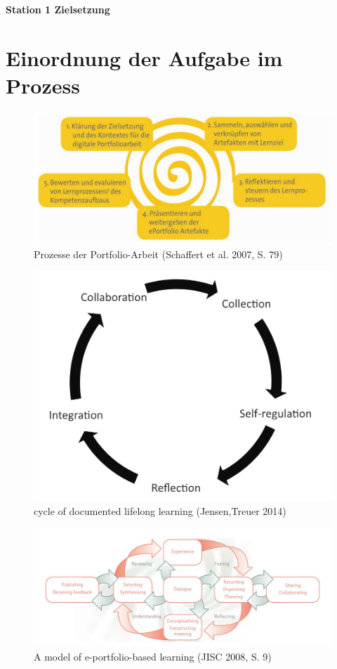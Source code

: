 \documentclass[a4paper,oneside]{scrarticle}
\begin{document}
	\pagestyle{fancy}
	\fancyhead{} %
	\fancyfoot{} %
	\begin{center}
		\begin{LARGE}
			\textbf{Station 1 Zielsetzung}
		\end{LARGE}
	\end{center}

	\section*{Einordnung der Aufgabe im Prozess}
	\begin{figure} [h]
		\centering
		\includegraphics[width=0.7\linewidth]{e-portfolio-prozesse-schaffert}
		\caption{Prozesse der Portfolio-Arbeit (Schaffert et al. 2007, S. 79)\cite{schaffert_e-portfolio-einsatz_2007}}
		\label{fig:e-portfolio-prozesse-schaffert}
	\end{figure}
	\begin{figure}[h]
		\centering
		\includegraphics[width=0.5\linewidth]{cycle-of-documented-lifelong-learning-Jensen}
		\caption{cycle of documented lifelong learning (Jensen,Treuer 2014)\cite{jenson_defining_2014}}
		\label{fig:cycle-of-documented-lifelong-learning-jensen}
	\end{figure}
	\begin{figure}[h]
		\centering
		\includegraphics[width=0.8\linewidth]{model-of-e-portfolio-based-learning}
		\caption{A model of e-portfolio-based learning (JISC 2008, S. 9) \cite{jisc_effective_2008}}
		\label{fig:model-of-e-portfolio-based-learning}
	\end{figure}
\end{document}
